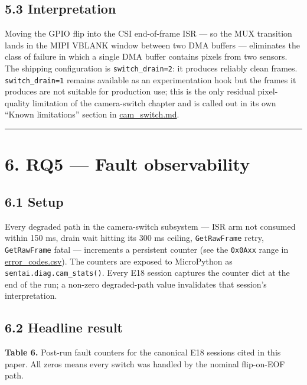 \subsection{5.3 Interpretation}\label{interpretation-2}

Moving the GPIO flip into the CSI end-of-frame ISR --- so the MUX
transition lands in the MIPI VBLANK window between two DMA buffers ---
eliminates the class of failure in which a single DMA buffer contains
pixels from two sensors. The shipping configuration is
\texttt{switch\_drain=2}: it produces reliably clean frames.
\texttt{switch\_drain=1} remains available as an experimentation hook
but the frames it produces are not suitable for production use; this is
the only residual pixel-quality limitation of the camera-switch chapter
and is called out in its own ``Known limitations'' section in
\url{cam_switch.md}.

\begin{center}\rule{0.5\linewidth}{0.5pt}\end{center}

\section{6. RQ5 --- Fault observability}\label{rq5-fault-observability}

\subsection{6.1 Setup}\label{setup-4}

Every degraded path in the camera-switch subsystem --- ISR arm not
consumed within 150 ms, drain wait hitting its 300 ms ceiling,
\texttt{GetRawFrame} retry, \texttt{GetRawFrame} fatal --- increments a
persistent counter (see the \texttt{0x0Axx} range in
\href{../error_codes.csv}{error\_codes.csv}). The counters are exposed
to MicroPython as \texttt{sentai.diag.cam\_stats()}. Every E18 session
captures the counter dict at the end of the run; a non-zero
degraded-path value invalidates that session's interpretation.

\subsection{6.2 Headline result}\label{headline-result}

\textbf{Table 6.} Post-run fault counters for the canonical E18 sessions
cited in this paper. All zeros means every switch was handled by the
nominal flip-on-EOF path.

